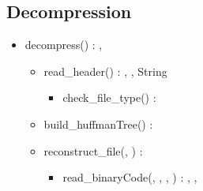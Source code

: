 \subsection{Decompression}


\begin{itemize}
    \item decompress(\binaryFile) : \binaryFile, \booleen
    \begin{itemize}
        \item read\_header(\binaryFile) : \statistics, \naturel, String
        \begin{itemize}
            \item check\_file\_type(\binaryFile) : \booleen
        \end{itemize}
        \item build\_huffmanTree(\statistics) : \huffmanTree
        \item reconstruct\_file(\binaryFile, \huffmanTree) : \binaryFile
        \begin{itemize}
            \item read\_binaryCode(\binaryFile, \naturel, \byte, \huffmanTree) : \byte, \byte, \naturel
        \end{itemize}
    \end{itemize}
\end{itemize}
